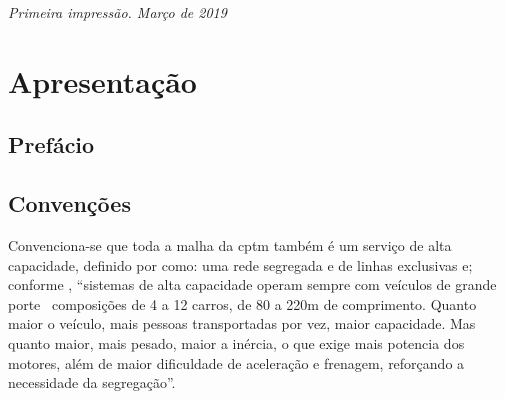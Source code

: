 \documentclass[11pt,fleqn]{book} %
\begin{document}
\vspace{0.5cm}

\noindent \textit{Primeira impressão. Março de 2019} %




\pagestyle{empty} %

\tableofcontents %

\cleardoublepage %

\pagestyle{fancy} %



\chapter*{Apresentação}

\section*{Prefácio}

\lipsum[1-2]

\section*{Convenções}

Convenciona-se que toda a malha da \gls{cptm} também é um serviço de alta capacidade, definido por \cite[pág. 32]{Isoda} como: uma rede segregada e de linhas exclusivas e; conforme \cite[pág. 51]{Isoda}, ``sistemas  de  alta  capacidade  operam  sempre  com  veículos  de  grande porte \textemdash\ composições de 4 a 12 carros, de 80 a 220m de comprimento. Quanto  maior  o  veículo,  mais  pessoas  transportadas  por  vez,  maior capacidade.  Mas  quanto  maior,  mais  pesado,  maior  a  inércia,  o  que exige  mais  potencia  dos  motores,  além  de  maior  dificuldade  de aceleração e frenagem, reforçando a necessidade da segregação''.
\end{document}
